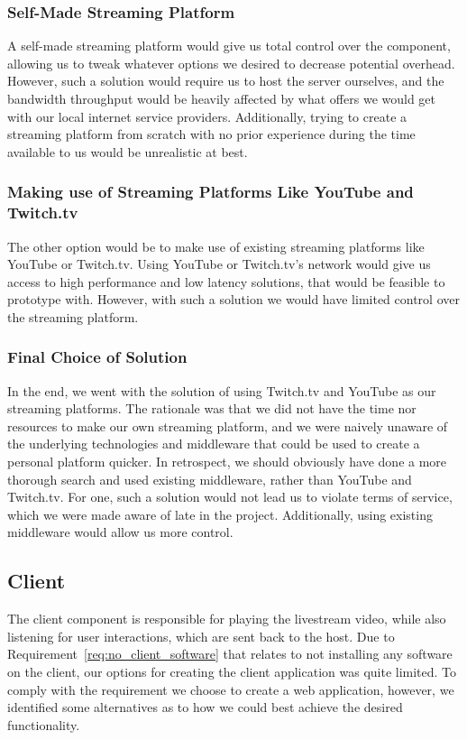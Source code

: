 \subsubsection{Self-Made Streaming Platform}
A self-made streaming platform would give us total control over the component, allowing us to tweak whatever options we desired to decrease potential overhead. However, such a solution would require us to host the server ourselves, and the bandwidth throughput would be heavily affected by what offers we would get with our local internet service providers. Additionally, trying to create a streaming platform from scratch with no prior experience during the time available to us would be unrealistic at best. 

\subsubsection{Making use of Streaming Platforms Like YouTube and Twitch.tv}
The other option would be to make use of existing streaming platforms like YouTube or Twitch.tv. Using YouTube or Twitch.tv's network would give us access to high performance and low latency solutions, that would be feasible to prototype with. However, with such a solution we would have limited control over the streaming platform.

\subsubsection{Final Choice of Solution}
\label{par:stream_dist_final}
In the end, we went with the solution of using Twitch.tv and YouTube as our streaming platforms. The rationale was that we did not have the time nor resources to make our own streaming platform, and we were naively unaware of the underlying technologies and middleware that could be used to create a personal platform quicker. In retrospect, we should obviously have done a more thorough search and used existing middleware, rather than YouTube and Twitch.tv. For one, such a solution would not lead us to violate terms of service\cite[5.1 G]{youtube_guidelines}\cite[9 viii]{ twitch_guidelines}, which we were made aware of late in the project. Additionally, using existing middleware would allow us more control. 

\subsection{Client}
The client component is responsible for playing the livestream video, while also listening for user interactions, which are sent back to the host.
Due to Requirement~\ref{req:no_client_software} that relates to not installing any software on the client, our options for creating the client application was quite limited. 
To comply with the requirement we choose to create a web application, however, we identified some alternatives as to how we could best achieve the desired functionality.

